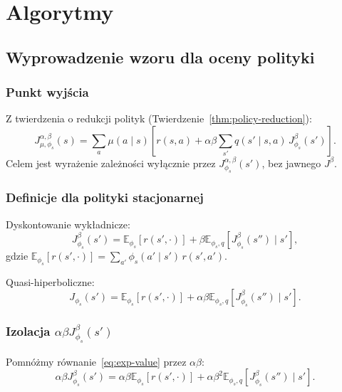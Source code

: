 \chapter{Algorytmy}

\section{Wyprowadzenie wzoru dla oceny polityki}

\subsection{Punkt wyjścia}

Z twierdzenia o redukcji polityk (Twierdzenie~\ref{thm:policy-reduction}):
\begin{equation}
J^{\alpha, \beta}_{\mu, \phi_s}(s) = \sum_a \mu(a\mid s) \left[ r(s, a) + \alpha\beta \sum_{s'} q(s'\mid s, a) \, J^{\beta}_{\phi_s}(s') \right].
\label{eq:policy-eval-start}
\end{equation}
Celem jest wyrażenie zależności wyłącznie przez $J^{\alpha, \beta}_{\phi_s}(s')$, bez jawnego $J^{\beta}$.

\subsection{Definicje dla polityki stacjonarnej}

Dyskontowanie wykładnicze:
\begin{equation}
J^{\beta}_{\phi_s}(s') = \mathbb{E}_{\phi_s} [r(s', \cdot)] + \beta \mathbb{E}_{\phi_s, q} [J^{\beta}_{\phi_s}(s'') \mid s'],
\label{eq:exp-value}
\end{equation}
gdzie $\mathbb{E}_{\phi_s} [r(s', \cdot)] = \sum_{a'} \phi_s(a'\mid s') \, r(s', a')$.

Quasi-hiperboliczne:
\begin{equation}
J_{\phi_s}(s') = \mathbb{E}_{\phi_s} [r(s', \cdot)] + \alpha \beta \mathbb{E}_{\phi_s, q} [J^{\beta}_{\phi_s}(s'') \mid s'].
\label{eq:qh-value-stat}
\end{equation}

\subsection{Izolacja \texorpdfstring{$\alpha \beta J^{\beta}_{\phi_s}(s')$}{alpha beta J}}

Pomnóżmy równanie~\eqref{eq:exp-value} przez $\alpha \beta$:
\begin{equation}
\alpha \beta J^{\beta}_{\phi_s}(s') = \alpha \beta \mathbb{E}_{\phi_s} [r(s', \cdot)] + \alpha \beta^2 \mathbb{E}_{\phi_s, q} [J^{\beta}_{\phi_s}(s'') \mid s'].
\label{eq:mult-ab}
\end{equation}

